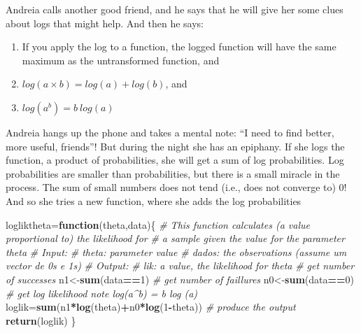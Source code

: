 \documentclass[
]{book}
\newenvironment{Shaded}{\begin{snugshade}}{\end{snugshade}}
\newcommand{\CommentTok}[1]{\textcolor[rgb]{0.56,0.35,0.01}{\textit{#1}}}
\newcommand{\ControlFlowTok}[1]{\textcolor[rgb]{0.13,0.29,0.53}{\textbf{#1}}}
\newcommand{\DecValTok}[1]{\textcolor[rgb]{0.00,0.00,0.81}{#1}}
\newcommand{\FunctionTok}[1]{\textcolor[rgb]{0.13,0.29,0.53}{\textbf{#1}}}
\newcommand{\NormalTok}[1]{#1}
\newcommand{\OtherTok}[1]{\textcolor[rgb]{0.56,0.35,0.01}{#1}}
\newcommand{\SpecialCharTok}[1]{\textcolor[rgb]{0.81,0.36,0.00}{\textbf{#1}}}
\begin{document}
Andreia calls another good friend, and he says that he will give her some clues about logs that might help. And then he says:

\begin{enumerate}
\def\labelenumi{\arabic{enumi}.}
\item
  If you apply the log to a function, the logged function will have the same maximum as the untransformed function, and
\item
  \(log(a \times b) = log(a)+log(b)\), and
\item
  \(log(a^b) = b~log (a)\)
\end{enumerate}

Andreia hangs up the phone and takes a mental note: ``I need to find better, more useful, friends''! But during the night she has an epiphany. If she logs the function, a product of probabilities, she will get a sum of log probabilities. Log probabilities are smaller than probabilities, but there is a small miracle in the process. The sum of small numbers does not tend (i.e., does not converge to) 0! And so she tries a new function, where she adds the log probabilities

\begin{Shaded}
\begin{Highlighting}[]
\NormalTok{logliktheta}\OtherTok{=}\ControlFlowTok{function}\NormalTok{(theta,data)\{}
  \CommentTok{\# This function calculates (a value proportional to) the likelihood for }
  \CommentTok{\# a sample given the value for the parameter theta }
  \CommentTok{\# Input:}
  \CommentTok{\#       theta: parameter value}
  \CommentTok{\#       dados: the observations (assume um vector de 0\textquotesingle{}s e 1\textquotesingle{}s)}
  \CommentTok{\# Output:}
  \CommentTok{\#       lik: a value, the likelihood for theta}
  \CommentTok{\# get number of successes}
\NormalTok{  n1}\OtherTok{\textless{}{-}}\FunctionTok{sum}\NormalTok{(data}\SpecialCharTok{==}\DecValTok{1}\NormalTok{)}
  \CommentTok{\# get number of faillures}
\NormalTok{  n0}\OtherTok{\textless{}{-}}\FunctionTok{sum}\NormalTok{(data}\SpecialCharTok{==}\DecValTok{0}\NormalTok{)}
  \CommentTok{\# get log likelihood note log(a\^{}b) = b log (a)}
\NormalTok{  loglik}\OtherTok{=}\FunctionTok{sum}\NormalTok{(n1}\SpecialCharTok{*}\FunctionTok{log}\NormalTok{(theta)}\SpecialCharTok{+}\NormalTok{n0}\SpecialCharTok{*}\FunctionTok{log}\NormalTok{(}\DecValTok{1}\SpecialCharTok{{-}}\NormalTok{theta))}
  \CommentTok{\# produce the output}
  \FunctionTok{return}\NormalTok{(loglik)}
\NormalTok{  \}}
\end{Highlighting}
\end{Shaded}
\end{document}
